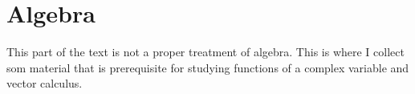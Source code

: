 \part{Algebra}

This part of the text is not a proper treatment of algebra.  This is where 
I collect som material that is prerequisite for studying functions of a 
complex variable and vector calculus.




